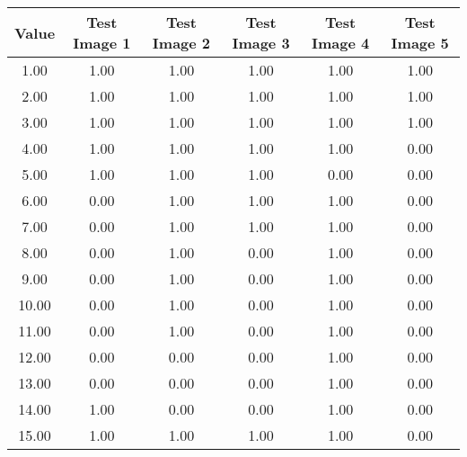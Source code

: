 \begin{tabular}{|c|c|c|c|c|c|}
\hline
\textbf{Value}&\textbf{Test Image 1}&\textbf{Test Image 2}&\textbf{Test Image 3}&\textbf{Test Image 4}&\textbf{Test Image 5}\\\hline
1.00&1.00&1.00&1.00&1.00&1.00\\\hline
2.00&1.00&1.00&1.00&1.00&1.00\\\hline
3.00&1.00&1.00&1.00&1.00&1.00\\\hline
4.00&1.00&1.00&1.00&1.00&0.00\\\hline
5.00&1.00&1.00&1.00&0.00&0.00\\\hline
6.00&0.00&1.00&1.00&1.00&0.00\\\hline
7.00&0.00&1.00&1.00&1.00&0.00\\\hline
8.00&0.00&1.00&0.00&1.00&0.00\\\hline
9.00&0.00&1.00&0.00&1.00&0.00\\\hline
10.00&0.00&1.00&0.00&1.00&0.00\\\hline
11.00&0.00&1.00&0.00&1.00&0.00\\\hline
12.00&0.00&0.00&0.00&1.00&0.00\\\hline
13.00&0.00&0.00&0.00&1.00&0.00\\\hline
14.00&1.00&0.00&0.00&1.00&0.00\\\hline
15.00&1.00&1.00&1.00&1.00&0.00\\\hline
\end{tabular}

